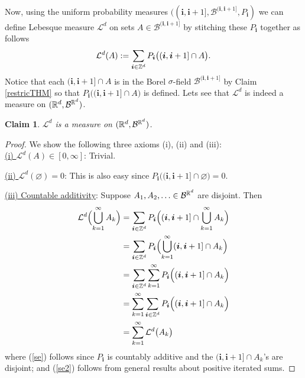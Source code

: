 \documentclass[10pt,letterpaper,twocolumn]{article}
\newtheorem{claim}{Claim}
\newcommand{\bs}{\boldsymbol}
\begin{document}
Now, using the uniform probability measures $((\bs i, \bs i +1],\mathcal B^{(\bs i,\bs i+1] }, P_{\bs i})$ we can define Lebesque measure $\mathcal L^d$ on sets $A\in\mathcal B^{(\bs i,\bs i+1] }$ by stitching these $P_{\bs i}$ together as follows
\begin{equation}
\label{Lm}
 \mathcal L^d(A):= \sum_{\bs i\in\Bbb Z^d} P_{\bs i}\bigl( (\bs i, \bs i+1]\cap A\bigr). 
 \end{equation}
Notice that each $ (\bs i, \bs i+1]\cap A$ is in the Borel $\sigma$-field $\mathcal B^{(\bs i,\bs i+1] }$ by Claim \ref{restricTHM} so that 
$P_{\bs i}\bigl( (\bs i, \bs i+1]\cap A\bigr)$ is defined.
Lets see that $\mathcal L^d$ is indeed a measure on $(\Bbb R^d,\mathcal B^{\Bbb R^d })$.
\begin{claim}
 $\mathcal L^d$  is a measure on $(\Bbb R^d,\mathcal B^{\Bbb R^d })$.
\end{claim}
\begin{proof}
We show the following three axioms (i), (ii) and (iii):\\
\noindent
\underline{(i)  $\mathcal L^d(A)\in [0,\infty]$}: Trivial.
 
 
  \vspace{.2cm}
\noindent
\underline{(ii)  $\mathcal L^d(\varnothing)=0$}: This is also easy since $P_{\bs i}\bigl( (\bs i, \bs i+1]\cap \varnothing\bigr)=0$.


  \vspace{.2cm}
\noindent
\underline{(iii) Countable additivity}: Suppose $A_1,A_2,\ldots\in\mathcal B^{\Bbb R^d }$ are disjoint. Then 
\begin{align}
\mathcal L^d\Bigl (\bigcup_{k=1}^\infty A_k\Bigr)&=\sum_{\bs i\in\Bbb Z^d} P_{\bs i}\Bigl((\bs i, \bs i+1] \cap \bigcup_{k=1}^\infty A_k \Bigr) \nonumber\\
&=\sum_{\bs i\in\Bbb Z^d} P_{\bs i}\Bigl( \bigcup_{k=1}^\infty (\bs i, \bs i+1] \cap A_k \Bigr) \nonumber\\
&=\sum_{\bs i\in\Bbb Z^d} \sum_{k=1}^\infty P_{\bs i} \Bigl((\bs i, \bs i+1] \cap A_k \Bigr)\label{se} \\
&=\sum_{k=1}^\infty  \sum_{\bs i\in\Bbb Z^d} P_{\bs i} \Bigl((\bs i, \bs i+1] \cap A_k \Bigr)\label{se2} \\
&=\sum_{k=1}^\infty  \mathcal L^d\bigl (A_k \bigr) \nonumber
\end{align}
where (\ref{se}) follows since $P_{\bs i}$ is countably additive and the $ (\bs i, \bs i+1]\cap A_k $'s are disjoint; and (\ref{se2}) follows from general results about positive iterated sums.
\end{proof}
\end{document}
